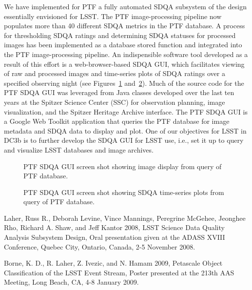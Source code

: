 We have
implemented for PTF a fully automated SDQA subsystem of the design essentially
envisioned for LSST.  The PTF image-processing pipeline now populates more than 40 different
SDQA metrics in the PTF database.  A process for thresholding SDQA ratings and determining 
SDQA statuses for processed images has been implemented as a database stored function and
integrated into the PTF image-processing pipeline.  An indispensible software tool developed 
as a result of this effort is a web-browser-based SDQA GUI, which facilitates viewing of raw and
processed images and time-series plots of SDQA ratings over a specified observing night 
(see Figures~\ref{PTFSDQAGUI1} and~\ref{PTFSDQAGUI2}).  Much of the source 
code for the PTF SDQA GUI was leveraged from Java classes developed over the last ten years at 
the Spitzer Science Center (SSC) for observation planning, image visualization, and the
Spitzer Heritage Archive interface.  The PTF SDQA GUI is a Google Web Toolkit application that
queries the PTF database for image metadata and SDQA data to display and plot.  One of our
objectives for LSST in DC3b is to further develop the SDQA GUI for LSST use, i.e., set it up to 
query and visualize LSST databases and image archives.

\begin{figure}
\caption{PTF SDQA GUI screen shot showing image display from query of PTF database.} 
 \label{PTFSDQAGUI1}
\end{figure}

\begin{figure}
\caption{PTF SDQA GUI screen shot showing SDQA time-series plots from query of PTF database.} 
 \label{PTFSDQAGUI2}
\end{figure}


\begin{thebibliography}{}

 Laher, Russ R., Deborah Levine, Vince Mannings, 
   Peregrine McGehee, Jeonghee Rho, Richard A. Shaw, and Jeff Kantor 2008,
   LSST Science Data Quality Analysis Subsystem Design,
   Oral presentation given at the ADASS XVIII Conference, Quebec City, Ontario, Canada, 
   2-5 November 2008.

 Borne, K. D., R. Laher, Z. Ivezic, and N. Hamam 2009,
   Petascale Object Classification of the LSST Event Stream, 
   Poster presented at the 213th AAS Meeting, Long Beach, CA, 4-8 January 2009.

\end{thebibliography}
